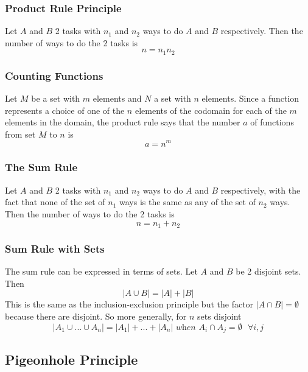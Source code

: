 \documentclass{article}
\begin{document}
\subsubsection{Product Rule Principle} Let $ A $ and $ B $ 2 tasks with $ n_1 $ and $ n_2 $ ways to do $ A $ and $ B $ respectively. Then the number of ways to do the 2 tasks is
\begin{equation}
n = n_1n_2
\end{equation}

\subsubsection{Counting Functions} Let $ M $ be a set with $ m $ elements and $ N $ a set with $ n $ elements. Since a function represents a choice of one of the $ n $ elements of the codomain for each of the $ m $ elements in the domain, the product rule says that the number $ a $ of functions from set $ M $ to $ n $ is
\begin{equation}
a = n^m
\end{equation}

\subsubsection{The Sum Rule} Let $ A $ and $ B $ 2 tasks with $ n_1 $ and $ n_2 $ ways to do $ A $ and $ B $ respectively, with the fact that none of the set of $ n_1 $ ways is the same as any of the set of $ n_2 $ ways. Then the number of ways to do the 2 tasks is
\begin{equation}
n = n_1 + n_2
\end{equation}

\subsubsection{Sum Rule with Sets} The sum rule can be expressed in terms of sets. Let $ A $ and $ B $ be 2 disjoint sets. Then
\begin{equation}
|A \cup B| = |A| + |B|
\end{equation}
This is the same as the inclusion-exclusion principle but the factor $ |A \cap B| = \emptyset $ because there are disjoint. So more generally, for $ n $ sets disjoint
\begin{equation}
|A_1 \cup ... \cup A_n| = |A_1| + ... + |A_n| \textit{ when } A_i \cap A_j = \emptyset \textit{ } \forall i,j
\end{equation}

\subsection{Pigeonhole Principle}
\end{document}
